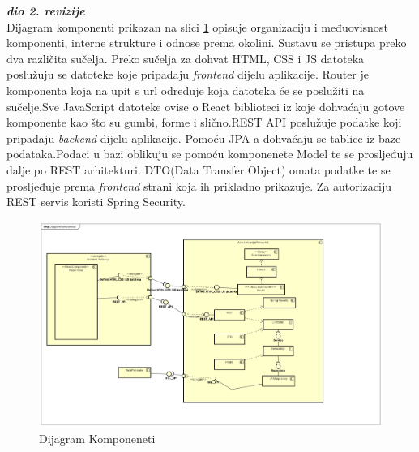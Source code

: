 			\textbf{\textit{dio 2. revizije}}\\
			
			\text   Dijagram komponenti prikazan na slici \ref{fig:4.12} opisuje organizaciju i međuovisnost
            komponenti, interne strukture i odnose prema okolini. Sustavu se pristupa preko dva različita sučelja. Preko sučelja za dohvat HTML, CSS i JS datoteka poslužuju se
            datoteke koje pripadaju \emph{frontend} dijelu aplikacije. Router je komponenta koja na
            upit s url odreduje koja datoteka će se poslužiti na sučelje.Sve JavaScript datoteke ovise o React biblioteci iz koje dohvaćaju gotove komponente kao što su gumbi, forme i slično.REST API poslužuje
            podatke koji pripadaju \emph{backend} dijelu aplikacije. Pomoću JPA-a dohvaćaju se tablice iz baze podataka.Podaci  u bazi oblikuju se pomoću komponenete Model te se prosljeđuju dalje po REST arhitekturi. DTO(Data Transfer Object) omata podatke te se prosljeđuje prema \emph{frontend} strani koja ih prikladno prikazuje. Za autorizaciju REST servis koristi Spring Security.
			
		\begin{figure}[H]
			\includegraphics[scale=0.3]{slike/Dijagram Komponeneti.png} %
			\centering
			\caption { Dijagram Komponeneti}
			\label{fig:4.12}
			\end{figure}
			

